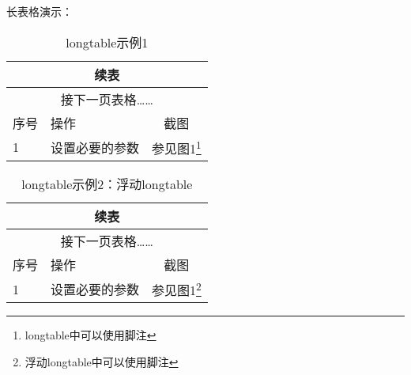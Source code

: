 \documentclass{ctexart}
\begin{document}
长表格演示：

\begin{longtable}[c]{|l|l|c|}
	\caption{longtable示例1}\\
	\hline
	\endfirsthead
	\multicolumn{3}{c}{续表}\\
	\hline
	\endhead
	\multicolumn{3}{c}{接下一页表格……}\\
	\hline
	\endfoot
	\hline
	\endlastfoot
	序号 & 操作 & 截图 \\
	\hline
	1 & 设置必要的参数  & 参见图1\footnote{longtable中可以使用脚注} \\
	\hline
\end{longtable}


\begin{table}[htbp]
\begin{longtable}[c]{|l|l|c|}
	\caption{longtable示例2：浮动longtable}\\
	\hline
	\endfirsthead
	\multicolumn{3}{c}{续表}\\
	\hline
	\endhead
	\multicolumn{3}{c}{接下一页表格……}\\
	\hline
	\endfoot
	\hline
	\endlastfoot
	序号 & 操作 & 截图 \\
	\hline
	1 & 设置必要的参数  & 参见图1\footnote{浮动longtable中可以使用脚注} \\
	\hline
\end{longtable}
\end{table}
\end{document}
